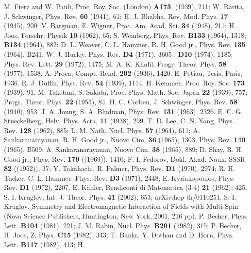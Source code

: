 \documentclass[a4paper,12pt]{article}
\begin{document}
\begin{thebibliography}{99}

  M. Fierz and W. Pauli, Proc. Roy. Soc. (London) \textbf{A173},
(1939), 211; W. Rarita, J. Schwinger, Phys. Rev. \textbf{60}
(1941), 61; H. J. Bhabha, Rev. Mod. Phys. \textbf{17} (1945), 200;
V. Bargman, E. Wigner, Proc. Am. Acad. Sci. \textbf{34} (1948),
211; H. Joos, Forschr. Physik \textbf{10} (1962), 65; S. Weinberg,
Phys. Rev. \textbf{B133} (1964), 1318; \textbf{B134} (1964), 882;
D. L. Weaver, C. L. Hammer, R. H. Good jr., Phys. Rev. \textbf{
135} (1964), B241; W. J. Hurley. Phys. Rev. \textbf{D4} (1971),
3605 ; \textbf{D10} (1974), 1185; Phys. Rev. Lett. \textbf{29}
(1972), 1475; M. A. K. Khalil, Progr. Theor. Phys. \textbf{58}
(1977), 1538.
 A. Proca, Compt. Rend. {\bf 202} (1936), 1420.
 E. Petiau, Tesis, Paris, 1936.
 R. J. Duffin, Phys. Rev. \textbf{54} (1939), 1114.
 H. Kemmer, Proc. Roy. Soc. \textbf{173} (1939), 91.
  M. Taketani, S. Sakata, Proc. Phys. Math. Soc. Japan \textbf{22}
(1939), 757; Progr. Theor. Phys. \textbf{22} (1955), 84.
  H. C. Corben, J. Schwinger, Phys. Rev. \textbf{58} (1940), 953.
  J. A. Joung, S. A. Bludman, Phys. Rev. \textbf{131} (1963), 2326.
 E. C. G. Stueckelberg, Helv. Phys. Acta, \textbf{11} (1938), 299.
  T. D. Lee, C. N. Yang, Phys. Rev. \textbf{128} (1962), 885;
L. M. Nath, Nucl. Phys. \textbf{57} (1964), 611; A.
Sankaranarayanan, R. H. Good jr., Nuovo Cim. \textbf{36} (1965),
1303; Phys. Rev. \textbf{140} (1965), B509; A. Sankaranarayanan,
Nuovo Cim. \textbf{38} (1965), 889; D. Shay, R. H. Good jr., Phys.
Rev. \textbf{179} ((1969)), 1410; F. I. Fedorov, Dokl. Akad. Nauk.
SSSR \textbf{82} ((1952)), 37; Y. Takahachi, R. Palmer, Phys. Rev.
\textbf{D1} (1970), 2974; R. H. Tucker, C. L. Hammer, Phys. Rev.
\textbf{D3} (1971), 2448; E. Kyriakopoulos, Phys. Rev. \textbf{D1}
(1972), 2207.
 E. K\"ahler, Rendiconti di Matematica (3-4)
\textbf{21} (1962), 425.
 S. I. Kruglov, Int. J. Theor. Phys. {\bf 41} (2002),
653; arXiv:hep-th/0110251.
 S. I. Kruglov, Symmetry and Electromagnetic Interaction of Fields
with Multi-Spin (Nova Science Publishers, Huntington, New York,
2001, 216 pp).
  P. Becher,  Phys. Lett. \textbf{B104} (1981),
221; J. M. Rabin,  Nucl. Phys. \textbf{B201} (1982), 315; P.
Becher, H. Joos,  Z. Phys. \textbf{C15} (1982), 343; T. Banks, Y.
Dothan and D. Horn, Phys. Lett. \textbf{B117 } (1982), 413; H.

\end{thebibliography}
\end{document}

